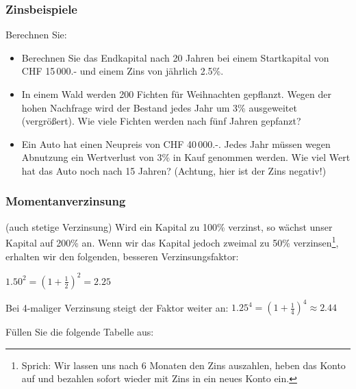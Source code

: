 \subsubsection{Zinsbeispiele}

Berechnen Sie:

\begin{itemize}
  \item Berechnen Sie das Endkapital nach 20 Jahren bei einem
  Startkapital von CHF 15\,000.- und einem Zins von jährlich
  2.5\%.\\%

\item In einem Wald werden 200 Fichten für Weihnachten
  gepflanzt. Wegen der hohen Nachfrage wird der Bestand jedes Jahr um
  3\% ausgeweitet (vergrößert).
  Wie viele Fichten werden nach fünf Jahren gepfanzt?


\item Ein Auto hat einen Neupreis von CHF 40\,000.-. Jedes Jahr müssen wegen Abnutzung ein Wertverlust von 3\% in Kauf
  genommen werden. Wie viel Wert hat das Auto noch nach 15 Jahren? (Achtung, hier ist der Zins negativ!)

\end{itemize}
\newpage

\subsubsection{Momentanverzinsung}
(auch stetige Verzinsung)
Wird ein Kapital zu 100\% verzinst, so wächst unser Kapital auf 200\%
an. Wenn wir das Kapital jedoch zweimal zu 50\%
verzinsen\footnote{Sprich: Wir lassen uns nach 6 Monaten den Zins
auszahlen, heben das Konto auf und bezahlen sofort wieder mit Zins in
ein neues Konto ein.}, erhalten wir den folgenden, besseren Verzinsungsfaktor:

$1.50^2  = (1 + \frac12)^2 = 2.25$

Bei 4-maliger Verzinsung steigt der Faktor weiter an:
$1.25^4 = (1 + \frac14)^4 \approx 2.44 $

Füllen Sie die folgende Tabelle aus:

